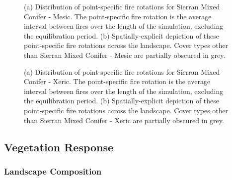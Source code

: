 \begin{figure}[!htbp]
  \centering
  \caption{(a) Distribution of point-specific fire rotations for Sierran Mixed Conifer - Mesic. The point-specific fire rotation is the average interval between fires over the length of the simulation, excluding the equilibration period. (b) Spatially-explicit depiction of these point-specific fire rotations across the landscape. Cover types other than Sierran Mixed Conifer - Mesic are partially obscured in grey.}
\label{fig:preturn_smcm}
\end{figure}

\begin{figure}[!htbp]
  \centering
  \caption{(a) Distribution of point-specific fire rotations for Sierran Mixed Conifer - Xeric. The point-specific fire rotation is the average interval between fires over the length of the simulation, excluding the equilibration period. (b) Spatially-explicit depiction of these point-specific fire rotations across the landscape. Cover types other than Sierran Mixed Conifer - Xeric are partially obscured in grey.}
\label{fig:preturn_smcx}
\end{figure}

\clearpage



\subsection{Vegetation Response}
\label{subsec:HRVvegresponse}


\subsubsection*{Landscape Composition} 

